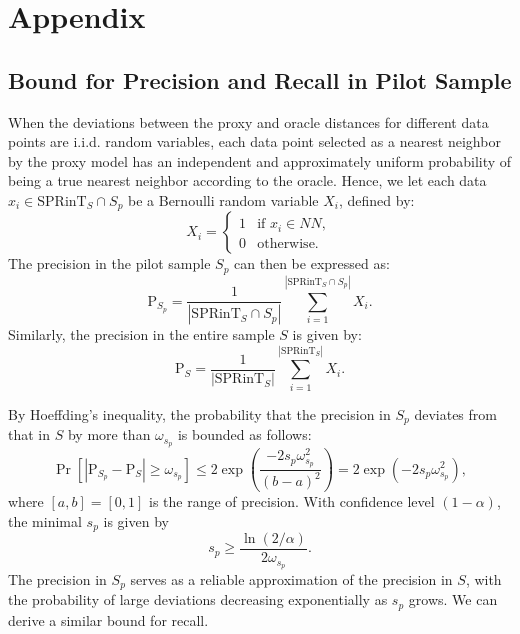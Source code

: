 \section{Appendix}\label{sec:appendix}
\subsection{Bound for Precision and Recall in Pilot Sample} \label{subsec:s_p_in_appendix}
When the deviations between the proxy and oracle distances for different data points are i.i.d. random variables\cite{DujianPQA}, each data point selected as a nearest neighbor by the proxy model has an independent and approximately uniform probability of being a true nearest neighbor according to the oracle. Hence, we let each data \( x_i \in \text{SPRinT}_S \cap S_{p} \) be a Bernoulli random variable \(X_i\), defined by: 
\begin{equation}
X_i = 
\begin{cases} 
1 & \text{if } x_i \in NN, \\
0 & \text{otherwise.}
\end{cases}
\end{equation}
The precision in the pilot sample \( S_{p} \) can then be expressed as:
\begin{equation}
\text{P}_{S_{p}} = \frac{1}{|\text{SPRinT}_S \cap S_{p}|} \sum_{i=1}^{|\text{SPRinT}_S \cap S_{p}|} X_i.
\end{equation}
Similarly, the precision in the entire sample \( S \) is given by:
\begin{equation}
\text{P}_S = \frac{1}{|\text{SPRinT}_S|} \sum_{i=1}^{|\text{SPRinT}_S|} X_i.
\end{equation}

By Hoeffding's inequality, the probability that the precision in \( S_{p} \) deviates from that in \( S \) by more than \( \omega_{s_p} \) is bounded as follows:
\begin{equation}
\Pr\left[ |\text{P}_{S_{p}} - \text{P}_S| \geq \omega_{s_p} \right] \leq 2 \exp\left( \frac{-2 s_{p} \omega_{s_p}^2}{(b-a)^2} \right) = 2 \exp\left( -2 s_{p} \omega_{s_p}^2 \right),
\label{eq:Hoef}
\end{equation}
where \([a, b] = [0, 1]\) is the range of precision. With confidence level \((1-\alpha)\), the minimal \(s_p\) is given by
\begin{equation}
s_p \geq \frac{\ln(2/\alpha)}{2\omega_{s_p}}.
\end{equation}
The precision in \( S_{p} \) serves as a reliable approximation of the precision in \( S \), with the probability of large deviations decreasing exponentially as \( s_{p} \) grows. We can derive a similar bound for recall.
 
